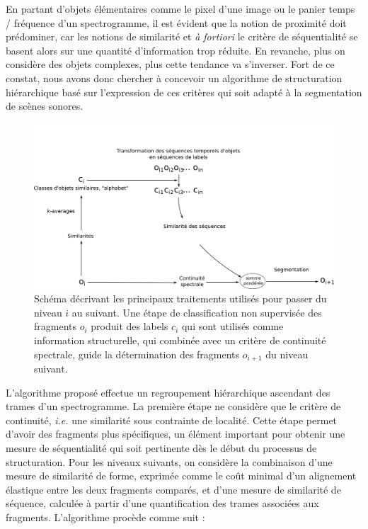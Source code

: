 
En partant d'objets élémentaires comme le pixel d'une image ou le panier temps / fréquence d'un spectrogramme, il est évident que la notion de proximité doit prédominer, car les notions de similarité et \textit{à fortiori} le critère de séquentialité se basent alors sur une quantité d'information trop réduite.  En revanche, plus on considère des objets complexes, plus cette tendance va s'inverser. Fort de ce constat, nous avons donc chercher à concevoir un algorithme de structuration hiérarchique basé sur l'expression de ces critères qui soit adapté à la segmentation de scènes sonores\cite{rossignolhal-01122006}.


\begin{figure}[t]
        \includegraphics[width=1\textwidth]{figures/alc_one_level.png}
       \caption{Schéma décrivant les principaux traitements utilisés pour passer du niveau $i$ au suivant. Une étape de classification non supervisée des fragments $o_i$ produit des labels $c_i$ qui sont utilisés comme information structurelle, qui combinée avec un critère de continuité spectrale, guide la détermination des fragments $o_{i+1}$ du niveau suivant.}\label{fig:alc}
\end{figure}

L'algorithme proposé effectue un regroupement hiérarchique ascendant des trames d'un spectrogramme. La première étape ne considère que le  critère de continuité, \textit{i.e.} une similarité sous contrainte de localité. Cette étape permet d'avoir des fragments plus spécifiques, un élément important pour obtenir une mesure de séquentialité qui soit pertinente dès le début du processus de structuration. Pour les niveaux suivants, on considère la combinaison d'une mesure de similarité de forme, exprimée comme le coût minimal d'un alignement élastique entre les deux fragments comparés, et d'une mesure de similarité de séquence, calculée à partir d'une quantification des trames associées aux fragments. L'algorithme procède comme suit :


